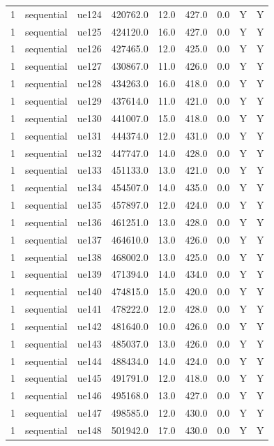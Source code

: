 \begin{table}[ht]
\begin{tabular}{|c|c|c|c|c|c|c|c|c|}
1 & sequential & ue124 & 420762.0 & 12.0 & 427.0 & 0.0 & Y & Y \\
1 & sequential & ue125 & 424120.0 & 16.0 & 427.0 & 0.0 & Y & Y \\
1 & sequential & ue126 & 427465.0 & 12.0 & 425.0 & 0.0 & Y & Y \\
1 & sequential & ue127 & 430867.0 & 11.0 & 426.0 & 0.0 & Y & Y \\
1 & sequential & ue128 & 434263.0 & 16.0 & 418.0 & 0.0 & Y & Y \\
1 & sequential & ue129 & 437614.0 & 11.0 & 421.0 & 0.0 & Y & Y \\
1 & sequential & ue130 & 441007.0 & 15.0 & 418.0 & 0.0 & Y & Y \\
1 & sequential & ue131 & 444374.0 & 12.0 & 431.0 & 0.0 & Y & Y \\
1 & sequential & ue132 & 447747.0 & 14.0 & 428.0 & 0.0 & Y & Y \\
1 & sequential & ue133 & 451133.0 & 13.0 & 421.0 & 0.0 & Y & Y \\
1 & sequential & ue134 & 454507.0 & 14.0 & 435.0 & 0.0 & Y & Y \\
1 & sequential & ue135 & 457897.0 & 12.0 & 424.0 & 0.0 & Y & Y \\
1 & sequential & ue136 & 461251.0 & 13.0 & 428.0 & 0.0 & Y & Y \\
1 & sequential & ue137 & 464610.0 & 13.0 & 426.0 & 0.0 & Y & Y \\
1 & sequential & ue138 & 468002.0 & 13.0 & 425.0 & 0.0 & Y & Y \\
1 & sequential & ue139 & 471394.0 & 14.0 & 434.0 & 0.0 & Y & Y \\
1 & sequential & ue140 & 474815.0 & 15.0 & 420.0 & 0.0 & Y & Y \\
1 & sequential & ue141 & 478222.0 & 12.0 & 428.0 & 0.0 & Y & Y \\
1 & sequential & ue142 & 481640.0 & 10.0 & 426.0 & 0.0 & Y & Y \\
1 & sequential & ue143 & 485037.0 & 13.0 & 426.0 & 0.0 & Y & Y \\
1 & sequential & ue144 & 488434.0 & 14.0 & 424.0 & 0.0 & Y & Y \\
1 & sequential & ue145 & 491791.0 & 12.0 & 418.0 & 0.0 & Y & Y \\
1 & sequential & ue146 & 495168.0 & 13.0 & 427.0 & 0.0 & Y & Y \\
1 & sequential & ue147 & 498585.0 & 12.0 & 430.0 & 0.0 & Y & Y \\
1 & sequential & ue148 & 501942.0 & 17.0 & 430.0 & 0.0 & Y & Y \\

\end{tabular}
\end{table}
